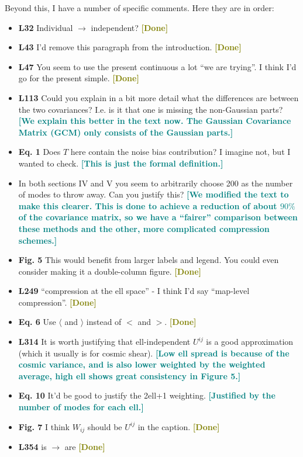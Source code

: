 \documentclass{article}
\newcommand\reply[1]{{\bf {\textcolor{teal}{[#1]}}}}
\newcommand\done{{\bf {\textcolor{olive}{[Done]}}}}
\begin{document}
	Beyond this, I have a number of specific comments. Here they are in order:
	\begin{itemize}
		\item \textbf{L32} Individual $\rightarrow$ independent? \done
		\item \textbf{L43} I'd remove this paragraph from the introduction. \done
		\item \textbf{L47} You seem to use the present continuous a lot “we are trying”. I think I'd go for the present simple. \done
		\item \textbf{L113} Could you explain in a bit more detail what the differences are between the two covariances? I.e. is it that one is missing the non-Gaussian parts? \reply{We explain this better in the text now. The Gaussian Covariance Matrix (GCM) only consists of the Gaussian parts.}
		\item \textbf{Eq. 1} Does $T$ here contain the noise bias contribution? I imagine not, but I wanted to check. \reply{This is just the formal definition.}
		\item In both sections IV and V you seem to arbitrarily choose 200 as the number of modes to throw away. Can you justify this? \reply{We modified the text to make this clearer. This is done to achieve a reduction of about $90\%$ of the covariance matrix, so we have a “fairer” comparison between these methods and the other, more complicated compression schemes.}
		\item \textbf{Fig. 5} This would benefit from larger labels and legend. You could even consider making it a double-column figure. \done
		\item \textbf{L249} “compression at the ell space” - I think I'd say “map-level compression”. \done
		\item \textbf{Eq. 6} Use $\langle$ and $\rangle$ instead of $<$ and $>$. \done
		\item \textbf{L314} It is worth justifying that ell-independent $U^{ij}$ is a good approximation (which it usually is for cosmic shear). \reply{Low ell spread is because of the cosmic variance, and is also lower weighted by the weighted average, high ell shows great consistency in Figure 5.}
		\item \textbf{Eq. 10} It'd be good to justify the 2ell+1 weighting. \reply{Justified by the number of modes for each ell.}
		\item \textbf{Fig. 7} I think $W_{ij}$ should be $U^{ij}$ in the caption. \done
		\item \textbf{L354} is $\rightarrow$ are \done

\end{itemize}
\end{document}
